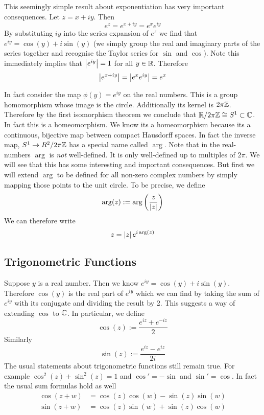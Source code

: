 This seemingly simple result about exponentiation has very important consequences. Let $z = x + iy$. Then
$$ e^{z} = e^{x + iy} = e^x e^{iy} $$
By substituting $iy$ into the series expansion of $e^z$ we find that $e^{iy} = \cos(y) + i \sin(y)$ (we simply group the real and imaginary parts of the series together and recognise the Taylor series for $\sin$ and $\cos$). Note this immediately implies that $\left|e^{iy}\right| = 1$ for all $y \in \mathbb{R}$. Therefore 
$$ \left|e^{x + iy}\right| = \left|e^x e^{iy}\right| = e^x $$

In fact consider the map $\phi(y) = e^{iy}$ on the real numbers. This is a group homomorphism whose image is the circle. Additionally its kernel is $2\pi\mathbb{Z}$. Therefore by the first isomorphism theorem we conclude that $\mathbb{R}/2\pi\mathbb{Z} \cong S^1 \subset \mathbb{C}$. In fact this is a homeomorphism. We know its a homeomorphism because its a continuous, bijective map between compact Hausdorff spaces. In fact the inverse map, $S^1 \to R^2/2\pi\mathbb{Z}$ has a special name called $\arg$. Note that in the real-numbers $\arg$ is \textit{not} well-defined. It is only well-defined up to multiples of $2\pi$. We will see that this has some interesting and important consequences. But first we will extend $\arg$ to be defined for all non-zero complex numbers by simply mapping those points to the unit circle. To be precise, we define
$$ \arg(z) := \arg \left( \frac{z}{\left|z\right|}\right) $$
We can therefore write
$$ z = \left|z\right|e^{i \arg(z)} $$

\subsection{Trigonometric Functions}
Suppose $y$ is a real number. Then we know $e^{iy} = \cos(y) + i \sin(y)$. Therefore $\cos(y)$ is the real part of $e^{iy}$ which we can find by taking the sum of $e^{iy}$ with its conjugate and dividing the result by 2. This suggests a way of extending $\cos$ to $\mathbb{C}$. In particular, we define
$$ \cos(z) := \frac{e^{iz} + e^{-iz}}{2} $$
Similarly
$$ \sin(z) := \frac{e^{iz} - e^{iz}}{2i} $$
The usual statements about trigonometric functions still remain true. For example $\cos^2(z) + \sin^2(z) = 1$ and $\cos' = -\sin$ and $\sin' = \cos$. In fact the usual sum formulas hold as well
\begin{align*}
    \cos(z + w) &= \cos(z)\cos(w) - \sin(z)\sin(w)\\
    \sin(z + w) &= \cos(z)\sin(w) + \sin(z)\cos(w)
\end{align*}

